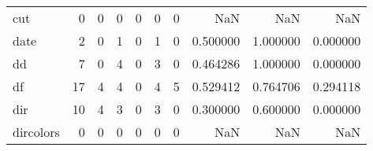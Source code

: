 \begin{tabular}{lrrrrrrrrr}
cut       &                                                  0 &                                                  0 &                                                  0 &                                                  0 &                                                  0 &                                                  0 &                                                NaN &                                    NaN &                                  NaN \\
date      &                                                  2 &                                                  0 &                                                  1 &                                                  0 &                                                  1 &                                                  0 &                                           0.500000 &                               1.000000 &                             0.000000 \\
dd        &                                                  7 &                                                  0 &                                                  4 &                                                  0 &                                                  3 &                                                  0 &                                           0.464286 &                               1.000000 &                             0.000000 \\
df        &                                                 17 &                                                  4 &                                                  4 &                                                  0 &                                                  4 &                                                  5 &                                           0.529412 &                               0.764706 &                             0.294118 \\
dir       &                                                 10 &                                                  4 &                                                  3 &                                                  0 &                                                  3 &                                                  0 &                                           0.300000 &                               0.600000 &                             0.000000 \\
dircolors &                                                  0 &                                                  0 &                                                  0 &                                                  0 &                                                  0 &                                                  0 &                                                NaN &                                    NaN &                                  NaN \\

\end{tabular}
